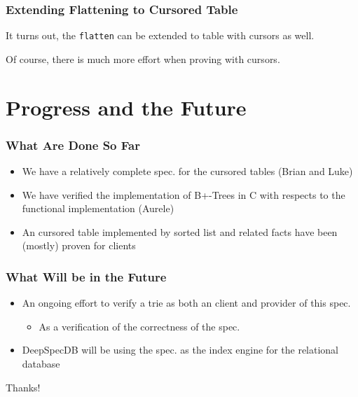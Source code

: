 \documentclass{beamer}
\begin{document}
\begin{frame}
\frametitle{Extending Flattening to Cursored Table}

It turns out, the \texttt{flatten} can be extended to table with cursors as
well. \\ \pause

Of course, there is much more effort when proving with cursors.

\end{frame}

\section{Progress and the Future}

\begin{frame}
\frametitle{What Are Done So Far}

\begin{itemize}
\item<1-> We have a relatively complete spec. for the cursored tables (Brian
  and Luke)
\item<2-> We have verified the implementation of B+-Trees in C with respects to
  the functional implementation (Aurele)
\item<3-> An cursored table implemented by sorted list and related facts have
  been (mostly) proven for clients
\end{itemize}

\end{frame}

\begin{frame}
\frametitle{What Will be in the Future}

\begin{itemize}
\item An ongoing effort to verify a trie as both an client and provider of
  this spec.
  \begin{itemize}
  \item As a verification of the correctness of the spec.
  \end{itemize}
  \pause
\item DeepSpecDB will be using the spec. as the index engine for the
  relational database
\end{itemize}

\end{frame}

\begin{frame}
  \begin{center}
    \Large{Thanks!}
  \end{center}

\end{frame}
\end{document}
